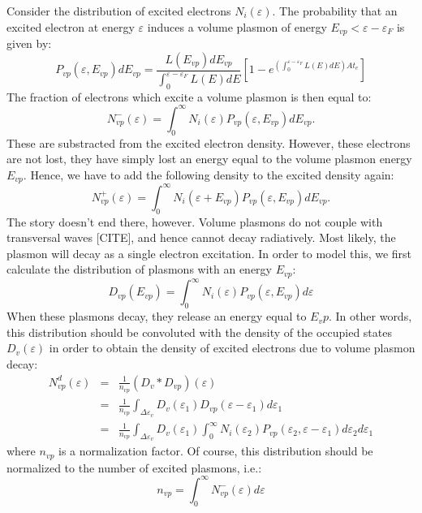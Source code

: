 \begin{refsection}
Consider the distribution of excited electrons $N_i(\varepsilon)$. The 
probability that an excited electron at energy $\varepsilon$ induces a volume 
plasmon of energy $E_{vp} < \varepsilon - \varepsilon_F$ is given by: 
\begin{equation} 
P_{vp}(\varepsilon, E_{vp}) dE_{vp} = 
\frac{L(E_{vp})dE_{vp}}{\int_0^{\varepsilon - \varepsilon_F} L(E) dE 
}\left[1-e^{\left(\int_0^{\varepsilon - \varepsilon_F} L(E) dE\right) A t_e 
}\right] 
\end{equation} 
The fraction of electrons which excite a volume plasmon is then equal to: 
\begin{equation} 
    N_{vp}^{-}(\varepsilon) = \int_0^\infty N_i(\varepsilon) 
P_{vp}(\varepsilon, E_{vp}) dE_{vp}. 
\end{equation} 
These are substracted from the excited electron density. However, these 
electrons are not lost, they have simply lost an energy equal to the volume 
plasmon energy $E_{vp}$. Hence, we have to add the following density to the 
excited density again: 
\begin{equation} 
    N_{vp}^{+}(\varepsilon) = \int_0^\infty N_i(\varepsilon + E_{vp}) 
P_{vp}(\varepsilon, E_{vp}) dE_{vp}. 
\end{equation} 
The story doesn't end there, however. Volume plasmons do not couple with 
transversal waves [CITE], and hence cannot decay radiatively. Most likely, the 
plasmon will decay as a single electron excitation. In order to model this, we 
first calculate the distribution of plasmons with an energy $E_{vp}$: 
\begin{equation} 
    D_{vp} (E_{vp})= \int_0^\infty N_i(\varepsilon) P_{vp}(\varepsilon, 
E_{vp}) d\varepsilon 
\end{equation} 
When these plasmons decay, they release an energy equal to $E_vp$. In other 
words, this distribution should be convoluted with the density of the occupied 
states $D_v(\varepsilon)$ in order to obtain the density of excited electrons 
due to volume plasmon decay: 
\begin{eqnarray} 
    N_{vp}^{d}(\varepsilon) &=& \frac{1}{n_{vp}}(D_v * D_{vp}) (\varepsilon) 
\\ 
    &=& \frac{1}{n_{vp}} \int_{\Delta\varepsilon_v} D_v(\varepsilon_1) 
D_{vp}(\varepsilon - \varepsilon_1) d\varepsilon_1 \\ 
    &=& \frac{1}{n_{vp}} \int_{\Delta\varepsilon_v} D_v(\varepsilon_1)  
    \int_0^\infty N_i(\varepsilon_2) P_{vp}(\varepsilon_2, \varepsilon - 
\varepsilon_1) d\varepsilon_2 d\varepsilon_1  
\end{eqnarray} 
where $n_{vp}$ is a normalization factor. Of course, this distribution should 
be normalized to the number of excited plasmons, i.e.: 
\begin{equation} 
    n_{vp} = \int_0^\infty N_{vp}^{-}(\varepsilon) d\varepsilon 
\end{equation} 
 

\end{refsection}

